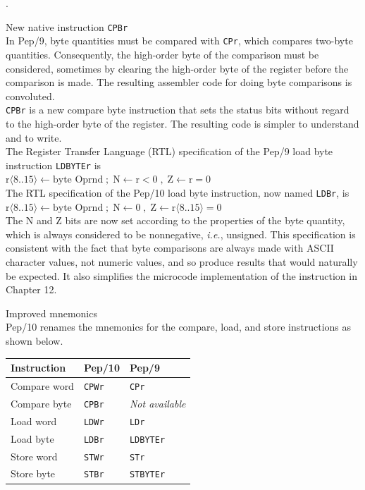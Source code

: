 \documentclass[10pt,fleqn]{book}
\newenvironment{exercises}
   {\begin{list}
      {\arabic{ecounter}.}
      {
         \usecounter{ecounter}
         \setcounter {ecounter}{0}
         \setlength\leftmargin{2pc}
         \setlength\labelwidth{6pc}
         \setlength\labelsep{1pc}
      }}
   {\end{list}}
\newcounter{ecounter}
\begin{document}
\begin{exercises}
\item New native instruction \verb|CPBr|\\[6pt]
In Pep/9, byte quantities must be compared with \verb|CPr|, which compares two-byte quantities.
Consequently, the high-order byte of the comparison must be considered, sometimes by clearing the high-order byte of the register before the comparison is made.
The resulting assembler code for doing byte comparisons is convoluted.\\[6pt]
\verb|CPBr| is a new compare byte instruction that sets the status bits without regard to the high-order byte of the register.
The resulting code is simpler to understand and to write.\\[6pt]
The Register Transfer Language (RTL) specification of the Pep/9 load byte instruction \verb|LDBYTEr| is\\[6pt]
$\textrm{r}\langle 8..15\rangle \leftarrow \textrm{byte Oprnd} \; ; \; \textrm{N}\leftarrow \textrm{r}<0 \; , \; \textrm{Z}\leftarrow \textrm{r}=0$\\[6pt]
The RTL specification of the Pep/10 load byte instruction, now named \verb|LDBr|, is\\[6pt]
$\textrm{r}\langle 8..15\rangle \leftarrow \textrm{byte Oprnd} \; ; \; \textrm{N}\leftarrow 0 \; , \; \textrm{Z}\leftarrow \textrm{r}\langle 8..15\rangle=0$\\[6pt]
The N and Z bits are now set according to the properties of the byte quantity, which is always considered to be nonnegative, \textit{i.e.}, unsigned.
This specification is consistent with the fact that byte comparisons are always made with ASCII character values, not numeric values, and so produce results that would naturally be expected.
It also simplifies the microcode implementation of the instruction in Chapter 12.

\item Improved mnemonics\\[6pt]
Pep/10 renames the mnemonics for the compare, load, and store instructions as shown below.\\[6pt]
\begin{tabular}{ l l l }
\toprule
Instruction & Pep/10       & Pep/9\\
\midrule
Compare word & \verb|CPWr| & \verb|CPr|\\
Compare byte & \verb|CPBr| & \textit{Not available}\\
Load word    & \verb|LDWr| & \verb|LDr|\\
Load byte    & \verb|LDBr| & \verb|LDBYTEr|\\
Store word   & \verb|STWr| & \verb|STr|\\
Store byte   & \verb|STBr| & \verb|STBYTEr|\\
\bottomrule
\end{tabular}


\end{exercises}
\end{document}
